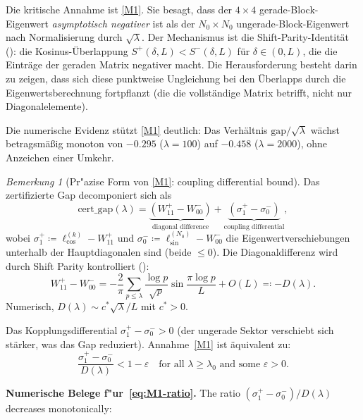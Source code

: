 ﻿\documentclass[12pt,a4paper]{article}
\theoremstyle{definition}
\theoremstyle{remark}
\newtheorem{remark}[theorem]{Bemerkung}
\begin{document}
\noindent Die kritische Annahme ist \ref{M1}. Sie besagt, dass der $4 \times 4$ gerade-Block-Eigenwert \emph{asymptotisch negativer} ist als der $N_0 \times N_0$ ungerade-Block-Eigenwert nach Normalisierung durch $\sqrt{\lambda}$. Der Mechanismus ist die Shift-Parity-Identität (): die Kosinus-Überlappung $S^+(\delta, L) < S^-(\delta, L)$ für $\delta \in (0, L)$, die die Einträge der geraden Matrix negativer macht. Die Herausforderung besteht darin zu zeigen, dass sich diese punktweise Ungleichung bei den Überlapps durch die Eigenwertsberechnung fortpflanzt (die die vollständige Matrix betrifft, nicht nur Diagonalelemente).

Die numerische Evidenz stützt \ref{M1} deutlich: Das Verhältnis $\mathrm{gap}/\sqrt{\lambda}$ wächst betragsmäßig monoton von $-0.295$ ($\lambda = 100$) auf $-0.458$ ($\lambda = 2000$), ohne Anzeichen einer Umkehr.

\begin{remark}[Pr"azise Form von \ref{M1}: coupling differential bound]
\label{rem:M1-precise}
Das zertifizierte Gap decomponiert sich als
\begin{equation}
\label{eq:gap-decomp}
  \mathrm{cert\_gap}(\lambda) = \underbrace{(W_{11}^+ - W_{00}^-)}_{\text{diagonal difference}} + \underbrace{(\sigma^+_1 - \sigma^-_0)}_{\text{coupling differential}},
\end{equation}
wobei $\sigma^+_1 \coloneqq \ell_{\cos}^{(k)} - W_{11}^+$ und $\sigma^-_0 \coloneqq \ell_{\sin}^{(N_0)} - W_{00}^-$ die Eigenwertverschiebungen unterhalb der Hauptdiagonalen sind (beide $\leq 0$). Die Diagonaldifferenz wird durch Shift Parity kontrolliert ():
\[
  W_{11}^+ - W_{00}^- = -\frac{2}{\pi}\sum_{p \leq \lambda}\frac{\log p}{\sqrt{p}}\sin\frac{\pi\log p}{L} + O(L) \eqqcolon -D(\lambda).
\]
Numerisch, $D(\lambda) \sim c^*\sqrt{\lambda}/L$ mit $c^* > 0$.

Das Kopplungsdifferential $\sigma^+_1 - \sigma^-_0 > 0$ (der ungerade Sektor verschiebt sich stärker, was das Gap reduziert). Annahme~\ref{M1} ist äquivalent zu:
\begin{equation}
\label{eq:M1-ratio}
  \frac{\sigma^+_1 - \sigma^-_0}{D(\lambda)} < 1 - \varepsilon \quad\text{for all } \lambda \geq \lambda_0 \text{ and some } \varepsilon > 0.
\end{equation}
\end{remark}

\noindent\textbf{Numerische Belege f"ur~\eqref{eq:M1-ratio}.} The ratio $(\sigma^+_1 - \sigma^-_0)/D(\lambda)$ decreases monotonically:
\end{document}
